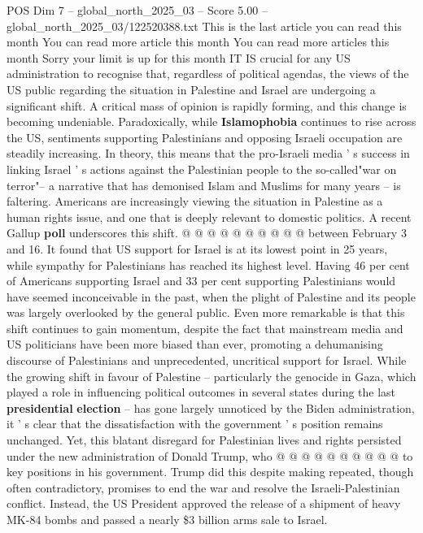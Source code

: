 \begin{textsample}{POS Dim 7 – global\_north\_2025\_03 – Score 5.00 – global\_north\_2025\_03/122520388.txt}  \label{ex:f7_pos_324}
This is the last article you can read this month You can read more article this month You can read more articles this month Sorry your limit is up for this month IT IS crucial for any US administration to recognise that, regardless of political agendas, the views of the US public regarding the situation in Palestine and Israel are undergoing a significant shift.
A critical mass of opinion is rapidly forming, and this change is becoming undeniable.
Paradoxically, while \textbf{Islamophobia} continues to rise across the US, sentiments supporting Palestinians and opposing Israeli occupation are steadily increasing.
In theory, this means that the pro-Israeli media ' s success in linking Israel ' s actions against the Palestinian people to the so-called"war on terror"-- a narrative that has demonised Islam and Muslims for many years -- is faltering.
Americans are increasingly viewing the situation in Palestine as a human rights issue, and one that is deeply relevant to domestic politics.
A recent Gallup \textbf{poll} underscores this shift. @ @ @ @ @ @ @ @ @ @ between February 3 and 16.
It found that US support for Israel is at its lowest point in 25 years, while sympathy for Palestinians has reached its highest level.
Having 46 per cent of Americans supporting Israel and 33 per cent supporting Palestinians would have seemed inconceivable in the past, when the plight of Palestine and its people was largely overlooked by the general public.
Even more remarkable is that this shift continues to gain momentum, despite the fact that mainstream media and US politicians have been more biased than ever, promoting a dehumanising discourse of Palestinians and unprecedented, uncritical support for Israel.
While the growing shift in favour of Palestine -- particularly the genocide in Gaza, which played a role in influencing political outcomes in several states during the last \textbf{presidential} \textbf{election} -- has gone largely unnoticed by the Biden administration, it ' s clear that the dissatisfaction with the government ' s position remains unchanged.
Yet, this blatant disregard for Palestinian lives and rights persisted under the new administration of Donald Trump, who @ @ @ @ @ @ @ @ @ @ to key positions in his government.
Trump did this despite making repeated, though often contradictory, promises to end the war and resolve the Israeli-Palestinian conflict.
Instead, the US President approved the release of a shipment of heavy MK-84 bombs and passed a nearly \$3 billion arms sale to Israel.

\end{textsample}
